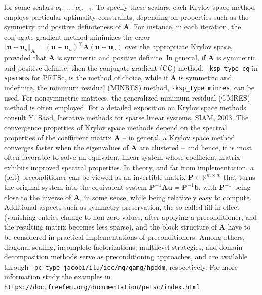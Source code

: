 \documentclass[9pt]{amsart}
\theoremstyle{remark}
\theoremstyle{definition}
\begin{document}
for some scalars $\alpha_0,\ldots,\alpha_{n-1}$. To specify these scalars, each Krylov space method employs particular optimality constraints, depending on properties such as the symmetry and positive definiteness of $\bm{A}$. For instance, in each iteration, the conjugate gradient method minimizes the error $\Vert\bm{u}-\bm{u}_n\Vert_{\bm{A}}=(\bm{u}-\bm{u}_n)^\top\bm{A}(\bm{u}-\bm{u}_n)$ over the appropriate Krylov space, provided that $\bm{A}$ is symmetric and positive definite. In general, if $\bm{A}$ is symmetric and positive definite, then the conjugate gradient (CG) method, \verb!-ksp_type cg! in \verb!sparams! for PETSc, is the method of choice, while if $\bm{A}$ is symmetric and indefinite, the minimum residual (MINRES) method, \verb!-ksp_type minres!, can be used. For nonsymmetric matrices, the generalized minimum residual (GMRES) method is often employed. For a detailed exposition on Krylov space methods consult Y. Saad, Iterative methods for sparse linear systems, SIAM, 2003. The convergence properties of Krylov space methods depend on the spectral properties of the coefficient matrix $\bm{A}$ -- in general, a Krylov space method converges faster when the eigenvalues of $\bm{A}$ are clustered -- and hence, it is most often favorable to solve an equivalent linear system whose coefficient matrix exhibits improved spectral properties. In theory, and far from implementation, a (left) preconditioner can be viewed as an invertible matrix $\bm{P}\in\mathbb{R}^{m\times m}$ that turns the original system into the equivalent system $\bm{P}^{-1}\bm{A}\bm{u}=\bm{P}^{-1}\bm{b}$, with $\bm{P}^{-1}$ being close to the inverse of $\bm{A}$, in some sense, while being relatively easy to compute. Additional aspects such as symmetry preservation, the so-called fill-in effect (vanishing entries change to non-zero values, after applying a preconditioner, and the resulting matrix becomes less sparse), and the block structure of $\bm{A}$ have to be considered in practical implementations of preconditioners. Among others, diagonal scaling, incomplete factorizations, multilevel strategies, and domain decomposition methods serve as preconditioning approaches, and are available through \verb!-pc_type jacobi/ilu/icc/mg/gamg/hpddm!, respectively. For more information study the examples in \verb!https://doc.freefem.org/documentation/petsc/index.html!
\end{document}
